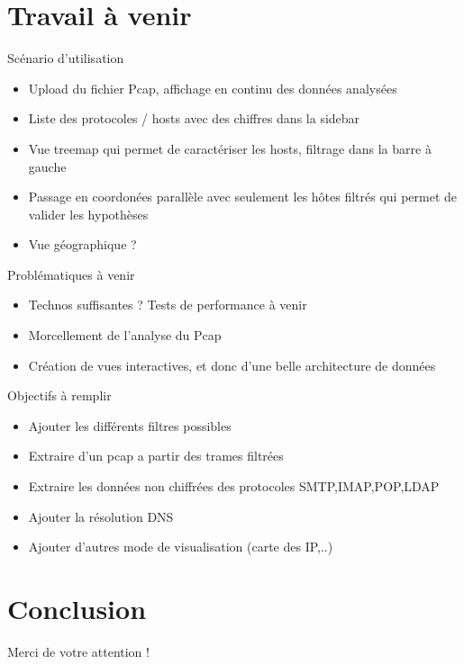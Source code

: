 \documentclass{beamer}
\begin{document}
  \section{Travail à venir}
  \begin{frame}
    Scénario d'utilisation
    \begin{itemize}
     \item Upload du fichier Pcap, affichage en continu des données analysées
     \item Liste des protocoles / hosts avec des chiffres dans la sidebar
     \item Vue treemap qui permet de caractériser les hosts, filtrage dans la
     barre à gauche
     \item Passage en coordonées parallèle avec seulement les hôtes filtrés qui
     permet de valider les hypothèses
     \item Vue géographique ?
    \end{itemize}
  \end{frame}
  
  \begin{frame}
    Problématiques à venir
    \begin{itemize}
     \item Technos suffisantes ? Tests de performance à venir
     \item Morcellement de l'analyse du Pcap
     \item Création de vues interactives, et donc d'une belle architecture de
     données
     \end{itemize}
  \end{frame}
  
  \begin{frame}
    Objectifs à remplir
    \begin{itemize}
     \item Ajouter les différents filtres possibles
     \item Extraire d'un pcap a partir des trames filtrées
     \item Extraire les données non chiffrées des protocoles SMTP,IMAP,POP,LDAP
     \item Ajouter la résolution DNS
     \item Ajouter d'autres mode de visualisation (carte des IP,..)
    \end{itemize}
  \end{frame}


  \section{Conclusion}
  \begin{frame}
    \begin{center}
      Merci de votre attention !
    \end{center}
  \end{frame}
\end{document}
